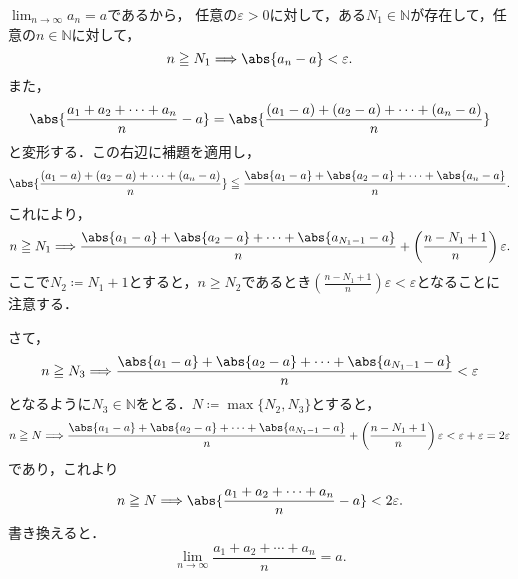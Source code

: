 \begin{tproof}
    $\lim_{n \to \infty} a_n =a$であるから，
    任意の$\varepsilon >0$に対して，ある$N_1 \in \mathbb{N}$が存在して，任意の$n \in \mathbb{N}$に対して，
    \[
        n \ge N_1 \Longrightarrow \abs{a_n -a}<\varepsilon.
    \]
    また，
    \[
        \abs{\frac{a_1+a_2+\cdots+a_n}{n}-a}= \abs{\frac{(a_1-a)+(a_2-a)+\cdots+(a_n-a)}{n}}
    \]
    と変形する．この右辺に補題を適用し，
    \[
        \abs{\frac{(a_1-a)+(a_2-a)+\cdots+(a_n-a)}{n}} \leqq \frac{\abs{a_1-a}+\abs{a_2-a}+\cdots+\abs{a_n-a}}{n}.
    \]
    これにより，
    \[
        n \ge N_1 \Longrightarrow \frac{\abs{a_1-a}+\abs{a_2-a}+\cdots+\abs{a_{N_1-1}-a}}{n} +\left( \frac{n-N_1+1}{n} \right ) \varepsilon.
    \]
    ここで$N_2 \coloneqq N_1 +1$とすると，$n \ge N_2$であるとき$\left( \frac{n-N_1+1}{n} \right ) \varepsilon < \varepsilon$となることに注意する．

    さて，
    \[
        n \ge N_3 \Longrightarrow \frac{\abs{a_1-a}+\abs{a_2-a}+\cdots+\abs{a_{N_1-1}-a}}{n}<\varepsilon
    \]
    となるように$N_3 \in \mathbb{N}$をとる．$N \coloneqq \max \{ N_2 , N_3 \}$とすると，
    \[
        n \ge N \Longrightarrow \frac{\abs{a_1-a}+\abs{a_2-a}+\cdots+\abs{a_{N_1-1}-a}}{n} +\left( \frac{n-N_1+1}{n} \right ) \varepsilon < \varepsilon + \varepsilon = 2 \varepsilon
    \]
    であり，これより
    \[
        n \ge N \Longrightarrow \abs{\frac{a_1+a_2+\cdots+a_n}{n}-a} < 2 \varepsilon.
    \]
    書き換えると．
    \[
        \lim_{n \to \infty} \frac{a_1+a_2+\cdots+a_n}{n}=a.
    \]
\end{tproof}





